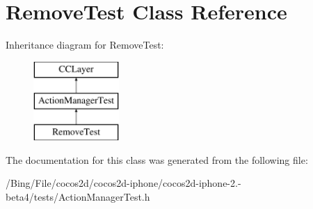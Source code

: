 \hypertarget{interface_remove_test}{\section{Remove\-Test Class Reference}
\label{interface_remove_test}
}
Inheritance diagram for Remove\-Test\-:\begin{figure}[H]
\begin{center}
\leavevmode
\includegraphics[height=3.000000cm]{interface_remove_test}
\end{center}
\end{figure}


The documentation for this class was generated from the following file\-:\begin{DoxyCompactItemize}
\item 
/\-Bing/\-File/cocos2d/cocos2d-\/iphone/cocos2d-\/iphone-\/2.-\/beta4/tests/Action\-Manager\-Test.\-h\end{DoxyCompactItemize}
